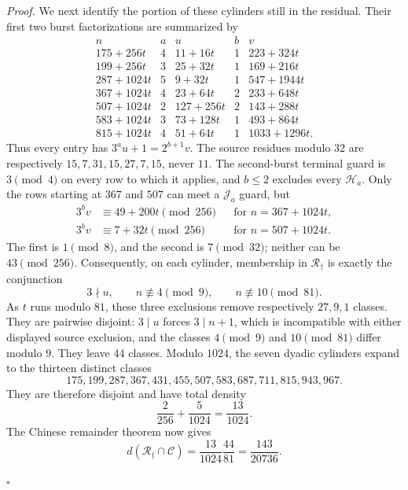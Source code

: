 \documentclass[11pt,letterpaper]{article}
\newenvironment{proof}{\noindent\textit{Proof.}}{\hfill\(\square\)}
\begin{document}
\begin{proof}
We next identify the portion of these cylinders still in the residual. Their
first two burst factorizations are summarized by
\[
\begin{array}{c|c|c|c|c}
n&a&u&b&v\\ \hline
175+256t&4&11+16t&1&223+324t\\
199+256t&3&25+32t&1&169+216t\\
287+1024t&5&9+32t&1&547+1944t\\
367+1024t&4&23+64t&2&233+648t\\
507+1024t&2&127+256t&2&143+288t\\
583+1024t&3&73+128t&1&493+864t\\
815+1024t&4&51+64t&1&1033+1296t.
\end{array}
\]
Thus every entry has \(3^au+1=2^{b+1}v\). The source residues modulo
\(32\) are respectively \(15,7,31,15,27,7,15\), never \(11\).
The second-burst terminal guard is \(3\pmod4\) on every row to which it
applies, and \(b\le2\) excludes every \(\mathcal H_a\). Only the rows
starting at \(367\) and \(507\) can meet a \(\mathcal J_a\) guard, but
\[
\begin{aligned}
3^bv&\equiv49+200t\pmod{256}&&\text{for }n=367+1024t,\\
3^bv&\equiv7+32t\pmod{256}&&\text{for }n=507+1024t.
\end{aligned}
\]
The first is \(1\pmod8\), and the second is \(7\pmod{32}\); neither can
be \(43\pmod{256}\). Consequently, on each cylinder, membership in
\(\mathcal R_{\dagger}\) is exactly the conjunction
\[
3\nmid u,\qquad n\not\equiv4\pmod9,
\qquad n\not\equiv10\pmod{81}.
\]
As \(t\) runs modulo \(81\), these three exclusions remove respectively
\(27,9,1\) classes. They are pairwise disjoint: \(3\mid u\) forces
\(3\mid n+1\), which is incompatible with either displayed source exclusion,
and the classes \(4\pmod9\) and \(10\pmod{81}\) differ modulo \(9\).
They leave \(44\) classes. Modulo \(1024\), the seven dyadic cylinders
expand to the thirteen distinct classes
\[
175,199,287,367,431,455,507,583,687,711,815,943,967.
\]
They are therefore disjoint and have total density
\[
\frac2{256}+\frac5{1024}=\frac{13}{1024}.
\]
The Chinese remainder theorem now gives
\[
d(\mathcal R_{\dagger}\cap\mathcal C)
 =\frac{13}{1024}\frac{44}{81}=\frac{143}{20736}.
\]


\end{proof}
\end{document}

